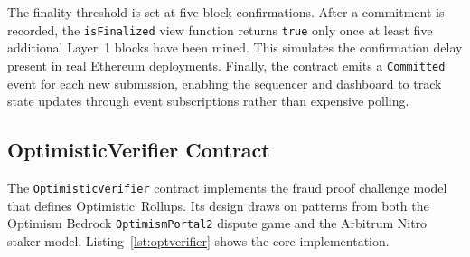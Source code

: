 The finality threshold is set at five block confirmations. After a commitment is recorded, the \texttt{isFinalized} view function returns \texttt{true} only once at least five additional Layer~1 blocks have been mined. This simulates the confirmation delay present in real Ethereum deployments. Finally, the contract emits a \texttt{Committed} event for each new submission, enabling the sequencer and dashboard to track state updates through event subscriptions rather than expensive polling.

\subsection{OptimisticVerifier Contract}

The \texttt{OptimisticVerifier} contract implements the fraud proof challenge model that defines Optimistic~Rollups. Its design draws on patterns from both the Optimism Bedrock \texttt{OptimismPortal2} dispute game and the Arbitrum Nitro staker model. Listing~\ref{lst:optverifier} shows the core implementation.

